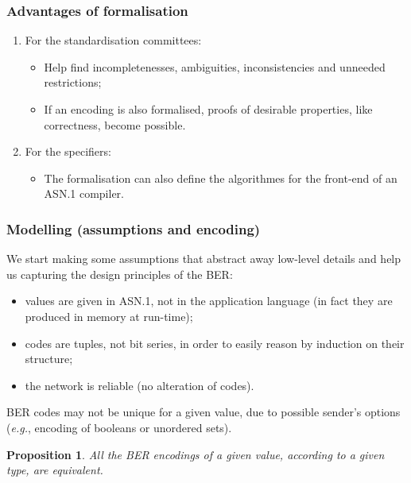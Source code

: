 \documentclass[compress,dvips,xcolor={dvipsnames},t]{beamer}
\newtheorem{proposition}{Proposition}
\newcommand\ASN{\textsf{ASN.1}\xspace}
\begin{document}
\begin{frame}
\frametitle{Advantages of formalisation}

\begin{enumerate}

  \item For the standardisation committees:
    \begin{itemize}

    \item Help find incompletenesses, ambiguities, inconsistencies and
      unneeded restrictions;

    \item If an encoding is also formalised, proofs of desirable
      properties, like correctness, become possible.

    \end{itemize}

  \item For the specifiers:
    \begin{itemize}

      \item The formalisation can also define the algorithmes for the
        front-end of an \ASN compiler.

    \end{itemize}

\end{enumerate}

\end{frame}

\begin{frame}
\frametitle{Modelling (assumptions and encoding)}

We start making some assumptions that abstract away low-level details
and help us capturing the design principles of the BER:
\begin{itemize}

  \item values are given in \ASN, not in the application language (in
  fact they are produced in memory at run-time);

  \item codes are tuples, not bit series, in order to easily reason by
  induction on their structure;

  \item the network is reliable (no alteration of codes).

\end{itemize}
BER codes may not be unique for a given value, due to possible
sender's options (\emph{e.g.}, encoding of booleans or unordered
sets).
\begin{proposition}
All the BER encodings of a given value, according to a given type, are
equivalent.
\end{proposition}

\end{frame}
\end{document}
